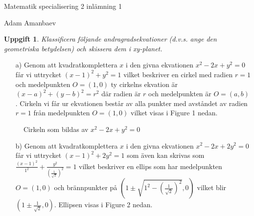 \documentclass{article}
\newtheorem{thr}{Uppgift}
\begin{document}


\newpage

\centerline{\large Matematik specialisering 2 inlämning 1}

\vskip 0.1cm

\centerline{\scriptsize Adam Amanbaev}

\vskip 1cm


\begin{thr}
Klassificera följande andragradsekvationer (d.v.s. ange den geometriska betydelsen) och skissera dem i xy-planet.
\end{thr}

\begin{enumerate}
    \item[a)] Genom att kvadratkomplettera $x$ i den givna ekvationen $x^2-2x+y^2=0$ får vi uttrycket $(x-1)^2+y^2=1$ vilket beskriver en cirkel med radien $r=1$ och medelpunkten $O=(1, 0)$ ty cirkelns ekvation är $(x-a)^2+(y-b)^2=r^2$ där radien är $r$ och medelpunkten är $O=(a, b)$. Cirkeln vi får ur ekvationen består av alla punkter med avståndet av radien $r=1$ från medelpunkten $O=(1, 0)$ vilket visas i Figure 1 nedan.
\end{enumerate}

\begin{figure}[h]
    \center
    \caption{\footnotesize Cirkeln som bildas av $x^2-2x+y^2=0$}
\end{figure}

\begin{enumerate}
    \item[b)] Genom att kvadratkomplettera $x$ i den givna ekvationen $x^2-2x+2y^2=0$ får vi uttrycket $(x-1)^2+2y^2=1$ som även kan skrivas som $\frac{(x-1)^2}{1^2}+\frac{y^2}{(\frac{1}{\sqrt{2}})^2}=1$ vilket beskriver en ellips som har medelpunkten $O=(1, 0)$ och brännpunkter på $(1 \pm \sqrt{1^2-(\frac{1}{\sqrt{2}})^2}, 0)$ vilket blir $(1 \pm \frac{1}{\sqrt{2}}, 0)$. Ellipsen visas i Figure 2 nedan.
\end{enumerate}
\end{document}
